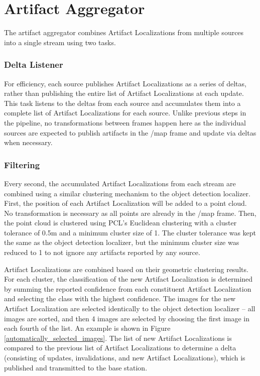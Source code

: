 \section{Artifact Aggregator}

The artifact aggregator combines Artifact Localizations from multiple sources into a single stream using two tasks. 

\subsubsection{Delta Listener}

For efficiency, each source publishes Artifact Localizations as a series of deltas, rather than publishing the entire list of Artifact Localizations at each update. This task listens to the deltas from each source and accumulates them into a complete list of Artifact Localizations for each source. Unlike previous steps in the pipeline, no transformations between frames happen here as the individual sources are expected to publish artifacts in the /map frame and update via deltas when necessary.

\subsubsection{Filtering} 

Every second, the accumulated Artifact Localizations from each stream are combined using a similar clustering mechanism to the object detection localizer. First, the position of each Artifact Localization will be added to a point cloud. No transformation is necessary as all points are already in the /map frame. Then, the point cloud is clustered using PCL's Euclidean clustering with a cluster tolerance of 0.5m and a minimum cluster size of 1. The cluster tolerance was kept the same as the object detection localizer, but the minimum cluster size was reduced to 1 to not ignore any artifacts reported by any source.
	
Artifact Localizations are combined based on their geometric clustering results. For each cluster, the classification of the new Artifact Localization is determined by summing the reported confidence from each constituent Artifact Localization and selecting the class with the highest confidence. The images for the new Artifact Localization are selected identically to the object detection localizer -- all images are sorted, and then 4 images are selected by choosing the first image in each fourth of the list. An example is shown in Figure \ref{automatically_selected_images}. The list of new Artifact Localizations is compared to the previous list of Artifact Localizations to determine a delta (consisting of updates, invalidations, and new Artifact Localizations), which is published and transmitted to the base station.
	
